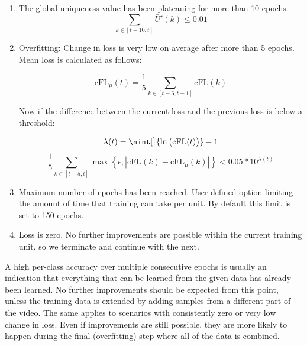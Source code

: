 \documentclass[9pt,lineno]{elife}
\DeclarePairedDelimiter{\nint}\lfloor\rceil
\newcommand*\mean[1]{\bar{#1}}
\begin{document}
\begin{appendixbox}
\begin{enumerate}
    \item The global uniqueness value has been plateauing for more than 10 epochs. 
    $$ \sum_{k\in[t-10,t]} \mean{U}'(k) \leq 0.01 $$
    
    \item Overfitting: Change in loss is very low on average after more than 5 epochs. Mean loss is calculated as follows:
    
    $$ \mathrm{cFL}_\mu(t) = \frac1{5}\sum_{k\in[t-6,t-1]} \mathrm{cFL}(k) $$
    
    Now if the difference between the current loss and the previous loss is below a threshold:
    
    $$ \lambda(t) = \nint[\big]{ \ln\big(\mathrm{cFL}(t)\big)} - 1 $$
    $$ \frac15 \sum_{k\in[t-5,t]} \max\left\{ \epsilon; \left| \mathrm{cFL}(k) - \mathrm{cFL}_\mu(k) \right| \right\} < 0.05 * 10^{\textstyle \lambda(t)} $$
    
    \item Maximum number of epochs has been reached. User-defined option limiting the amount of time that training can take per unit. By default this limit is set to 150 epochs. %
    
    \item Loss is zero. No further improvements are possible within the current training unit, so we terminate and continue with the next.
\end{enumerate}

A high per-class accuracy over multiple consecutive epochs is usually an indication that everything that can be learned from the given data has already been learned. No further improvements should be expected from this point, unless the training data is extended by adding samples from a different part of the video. The same applies to scenarios with consistently zero or very low change in loss. Even if improvements are still possible, they are more likely to happen during the final (overfitting) step where all of the data is combined.




\end{appendixbox}
\end{document}
